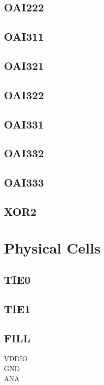 \documentclass[10pt,a4paper,twoside]{report}
\begin{document}
\section{OAI222}

\clearpage

\section{OAI311}

\clearpage

\section{OAI321}

\clearpage

\section{OAI322}

\clearpage

\section{OAI331}

\clearpage

\section{OAI332}

\clearpage

\section{OAI333}

\clearpage


\section{XOR2}

\clearpage

\onecolumn

\chapter{Physical Cells}
\clearpage

\twocolumn

\section{TIE0}

\clearpage

\section{TIE1}

\clearpage

\section{FILL}

\clearpage

VDDIO \\
GND \\
ANA

\onecolumn
\end{document}
